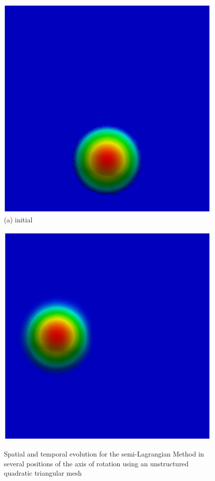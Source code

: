 \vspace{0.5cm}
\begin{figure}[H]
     \caption{
Spatial and temporal evolution for the semi-Lagrangian Method in several positions of the axis of rotation using an unstructured quadratic triangular mesh}	
     \centering
     \begin{minipage}{.5\linewidth}
      \centering
      \includegraphics[scale=0.42]{./02_chaps/cap_validation/figure/figSLquad0.png}\\
      (a) initial
     \end{minipage}%
     \begin{minipage}{.5\linewidth}
      \centering
      \includegraphics[scale=0.42]{./02_chaps/cap_validation/figure/figSLquad1.png}\\

\end{minipage}
\end{figure}
